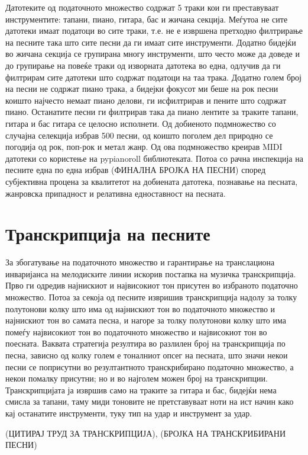 Датотеките од податочното множество содржат 5 траки кои ги преставуваат инструментите: тапани, пиано, гитара, бас и жичана секција. Меѓутоа не сите датотеки имаат податоци во сите траки, т.е. не е извршена претходно филтрирање на песните така што сите песни да ги имаат сите инструменти. Додатно бидејќи во жичана секција се групирана многу инструменти, што често може да доведе и до групирање на повеќе траки од изворната датотека во една, одлучив да ги филтрирам сите датотеки што содржат податоци на таа трака. Додатно голем број на песни не содржат пиано трака, а бидејки фокусот ми беше на рок песни коишто најчесто немаат пиано делови, ги исфилтрирав и пените што содржат пиано. Останатите песни ги филтрирав така да пиано лентите за траките тапани, гитара и бас гитара се целосно исполнети. Од добиеното подмножество со случајна селекција избрав 500 песни, од коишто поголем дел природно се погодија од рок, поп-рок и метал жанр. Од ова подмножество креирав MIDI датотеки со користење на pypianoroll библиотеката. Потоа со рачна инспекција на песните една по една избрав (ФИНАЛНА БРОЈКА НА ПЕСНИ) според субјективна процена за квалитетот на добиената датотека, познавање на песната, жанровска припадност и релативна едноставност на песната.

\section{Транскрипција на песните}

За збогатување на податочното множество и гарантирање на транслациона инваријанса на мелодиските линии искорив постапка на музичка транскрипција. Прво ги одредив најнискиот и највисокиот тон присутен во избраното податочно множество. Потоа за секоја од песните извришив транскрипција надолу за толку полутонови колку што има од најнискиот тон во податочното множество и најнискиот тон во самата песна, и нагоре за толку полутонови колку што има помеѓу највисокиот тон во податочното множество и највисокиот тон во поесната. Ваквата стратегија резултира во разлилен број на транскрипција по песна, зависно од колку голем е тоналниот опсег на песната, што значи некои песни се поприсутни во резултантното транскрибирано податочно множество, а некои помалку присутни; но и во најголем можен број на транскрипции. Транскрипцијата ја извршив само на траките за гитара и бас, бидејќи нема смисла за тапани, таму миди тоновите не претставуваат ноти на ист начин како кај останатите инструменти, туку тип на удар и инструмент за удар.

(ЦИТИРАЈ ТРУД ЗА ТРАНСКРИПЦИЈА), (БРОЈКА НА ТРАНСКРИБИРАНИ ПЕСНИ)


